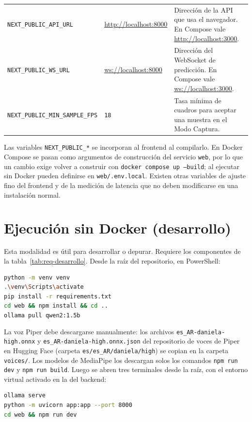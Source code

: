 \begin{table}[H]
\begin{tabularx}{\textwidth}{>{\raggedright\arraybackslash}p{4.3cm} >{\raggedright\arraybackslash}p{3.4cm} X}
    \texttt{NEXT\_PUBLIC\_\allowbreak API\_URL} & \url{http://localhost:8000} & Dirección de la API que usa el navegador. En Compose vale \url{http://localhost:3000}. \\
    \texttt{NEXT\_PUBLIC\_\allowbreak WS\_URL} & \url{ws://localhost:8000} & Dirección del WebSocket de predicción. En Compose vale \url{ws://localhost:3000}. \\
    \texttt{NEXT\_PUBLIC\_\allowbreak MIN\_SAMPLE\_FPS} & \texttt{18} & Tasa mínima de cuadros para aceptar una muestra en el Modo Captura. \\
    \bottomrule
  \end{tabularx}
\end{table}

Las variables \texttt{NEXT\_PUBLIC\_*} se incorporan al frontend al compilarlo. En Docker Compose se pasan como argumentos de construcción del servicio \texttt{web}, por lo que un cambio exige volver a construir con \texttt{docker compose up --build}; al ejecutar sin Docker pueden definirse en \texttt{web/.env.local}. Existen otras variables de ajuste fino del frontend y de la medición de latencia que no deben modificarse en una instalación normal.

\section{Ejecución sin Docker (desarrollo)}

Esta modalidad es útil para desarrollar o depurar. Requiere los componentes de la tabla~\ref{tab:req-desarrollo}. Desde la raíz del repositorio, en PowerShell:

\begin{lstlisting}[numbers=none, language=bash]
python -m venv venv
.\venv\Scripts\activate
pip install -r requirements.txt
cd web && npm install && cd ..
ollama pull qwen2:1.5b
\end{lstlisting}

La voz Piper debe descargarse manualmente: los archivos \texttt{es\_AR-daniela-high.onnx} y \texttt{es\_AR-daniela-high.onnx.json} del repositorio de voces de Piper en Hugging Face (carpeta \texttt{es/es\_AR/daniela/high}) se copian en la carpeta \texttt{voices/}. Los modelos de MediaPipe los descargan solos los comandos \texttt{npm run dev} y \texttt{npm run build}. Luego se abren tres terminales desde la raíz, con el entorno virtual activado en la del backend:

\begin{lstlisting}[numbers=none, language=bash]
ollama serve
python -m uvicorn app:app --port 8000
cd web && npm run dev
\end{lstlisting}

